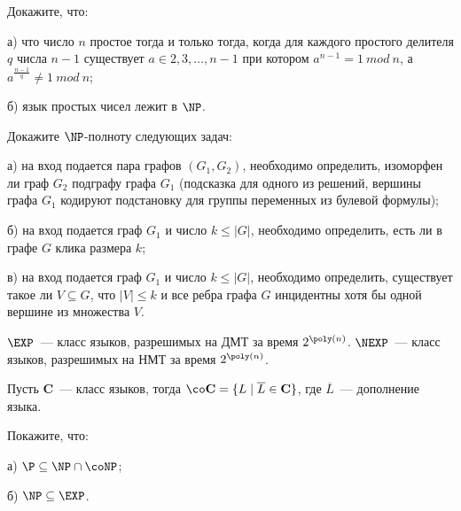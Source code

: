 
\begin{task}
    Докажите, что:
   	\begin{enumtask}
        \item [а)] что число $n$ простое тогда и только тогда, когда для каждого простого делителя $q$ числа $n - 1$
        существует $a \in {2, 3, \dots, n - 1}$ при котором $a^{n - 1} = 1~mod~n$, а $a^{\frac{n - 1}{q}} \ne 1~mod~n$;
       \item [б)] язык простых чисел лежит в $\NP$.
	\end{enumtask}
\end{task}


\begin{task}
    Докажите $\NP$-полноту следующих задач:
    \begin{enumtask}
        \item [а)] на вход подается пара графов $(G_1, G_2)$, необходимо определить, изоморфен ли граф $G_2$ подграфу графа $G_1$
            (подсказка для одного из решений, вершины графа $G_1$ кодируют подстановку для группы переменных из булевой формулы);
        \item [б)] на вход подается граф $G_1$ и число $k \le |G|$, необходимо определить, есть ли в графе $G$ клика размера $k$;
        \item [в)] на вход подается граф $G_1$ и число $k \le |G|$, необходимо определить, существует такое ли $V \subseteq G$,
            что $|V| \le k$ и все ребра графа $G$ инцидентны хотя бы одной вершине из множества $V$.
	\end{enumtask}
\end{task}

\vspace{0.5cm}

$\EXP$~--- класс языков, разрешимых на ДМТ за время $2^{\poly(n)}$. $\NEXP$~--- класс языков, разрешимых на НМТ за время
$2^{\poly(n)}$.

Пусть $\mathbf{C}$~--- класс языков, тогда ${\co}\mathbf{C} = \{L \mid \overline{L} \in \mathbf{C}\}$, где $\overline{L}$~---
дополнение языка.

\begin{task}
    Покажите, что:
    \begin{enumtask}[topsep = 0pt, itemsep = -1ex]
        \item [а)] $\P \subseteq \NP \cap \coNP$;
        \item [б)] $\NP \subseteq \EXP$.
	\end{enumtask}
\end{task}

